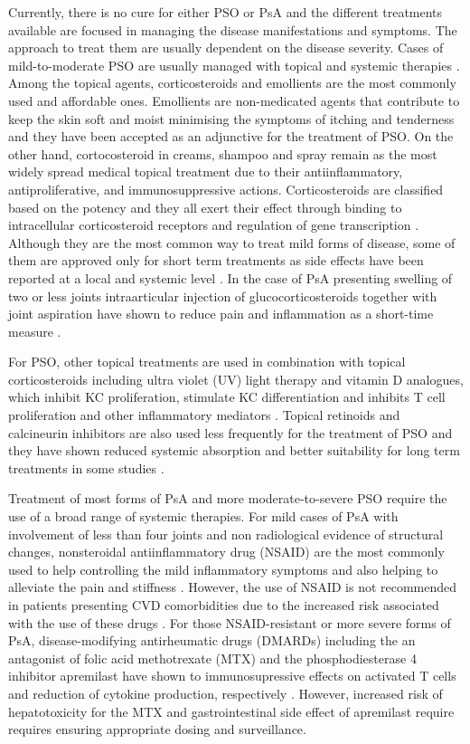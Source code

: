 Currently, there is no cure for either PSO or PsA and the different treatments available are focused in managing the disease manifestations and symptoms. The approach to treat them are usually dependent on the disease severity. Cases of mild-to-moderate PSO are usually managed with topical and systemic therapies \parencite{Menter2009}. Among the topical agents, corticosteroids and emollients are the most commonly used and affordable ones. Emollients are non-medicated agents that contribute to keep the skin soft and moist minimising the symptoms of itching and tenderness and they have been accepted as an adjunctive for the treatment of PSO. On the other hand, cortocosteroid in creams, shampoo and spray remain as the most widely spread medical topical treatment due to their antiinflammatory, antiproliferative, and immunosuppressive actions. Corticosteroids are classified based on the potency and they all exert their effect through binding to intracellular corticosteroid receptors and regulation of gene transcription \parencite{Tadicherla2009}. Although they are the most common way to treat mild forms of disease, some of them are approved only for short term treatments as side effects have been reported at a local and systemic level \parencite {Menter2009}. In the case of PsA presenting swelling of two or less joints intraarticular injection of glucocorticosteroids together with joint aspiration have shown to reduce pain and inflammation as a short-time measure \parencite{Coates2016}.    

For PSO, other topical treatments are used in combination with topical corticosteroids including ultra violet (UV) light therapy and vitamin D analogues, which inhibit KC proliferation, stimulate KC differentiation and inhibits T cell proliferation and other inflammatory mediators \parencite{Rizova2001}. Topical retinoids and calcineurin inhibitors are also used less frequently for the treatment of PSO and they have shown reduced systemic absorption and better suitability for long term treatments in some studies \parencite{Weinstein2003, Menter2009}.

Treatment of most forms of PsA and more moderate-to-severe PSO require the use of a broad range of systemic therapies. For mild cases of PsA with involvement of less than four joints and non radiological evidence of structural changes, nonsteroidal antiinflammatory drug (NSAID) are the most commonly used to help controlling the mild inflammatory symptoms and also helping to alleviate the pain and stiffness \parencite{Coates2016}. However, the use of NSAID is not recommended in patients presenting CVD comorbidities due to the increased risk associated with the use of these drugs \parencite{Bhala2013}. For those NSAID-resistant or more severe forms of PsA, disease-modifying antirheumatic drugs (DMARDs) including the an antagonist of folic acid methotrexate (MTX) and the phosphodiesterase 4 inhibitor apremilast have shown to immunosupressive effects on activated T cells and reduction of cytokine production, respectively \parencite{Schmitt2014, Gossec2016, Keating2017,Polachek2017}. However, increased risk of hepatotoxicity for the MTX  and gastrointestinal side effect  of apremilast  require requires ensuring appropriate dosing and surveillance. 


